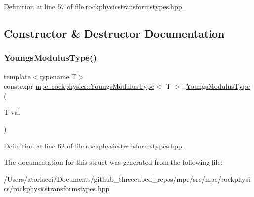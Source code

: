 Definition at line 57 of file rockphysicstransformstypes.\+hpp.



\subsection{Constructor \& Destructor Documentation}
\mbox{\label{structmpc_1_1rockphysics_1_1_youngs_modulus_type_aa7eea6b3c1ef9af10982c210c56f7582}} 
\subsubsection{\texorpdfstring{Youngs\+Modulus\+Type()}{YoungsModulusType()}}
{\footnotesize\ttfamily template$<$typename T$>$ \\
constexpr \mbox{\hyperlink{structmpc_1_1rockphysics_1_1_youngs_modulus_type}{mpc\+::rockphysics\+::\+Youngs\+Modulus\+Type}}$<$ T $>$\+::\mbox{\hyperlink{structmpc_1_1rockphysics_1_1_youngs_modulus_type}{Youngs\+Modulus\+Type}} (\begin{DoxyParamCaption}\item[{T}]{val }\end{DoxyParamCaption})\hspace{0.3cm}{\ttfamily [inline]}}



Definition at line 62 of file rockphysicstransformstypes.\+hpp.



The documentation for this struct was generated from the following file\+:\begin{DoxyCompactItemize}
\item 
/\+Users/atorlucci/\+Documents/github\+\_\+threecubed\+\_\+repos/mpc/src/mpc/rockphysics/\mbox{\hyperlink{rockphysicstransformstypes_8hpp}{rockphysicstransformstypes.\+hpp}}\end{DoxyCompactItemize}
